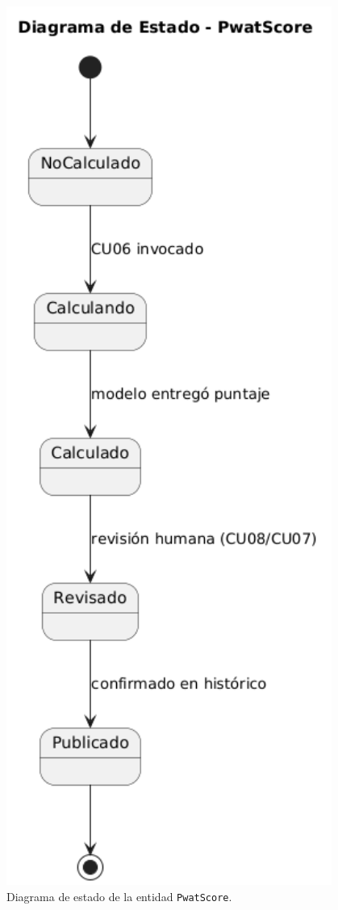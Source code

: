 \begin{figure}[H]
  \centering
  \includegraphics[width=0.95\textwidth,height=0.5\textheight,keepaspectratio]{imagenes/estado_pwatscore.png}
  \caption{Diagrama de estado de la entidad \texttt{PwatScore}.}
  \label{fig:estado_pwatscore}
\end{figure}

